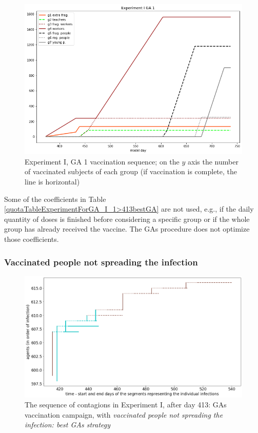 \documentclass[graybox]{svmult}
\begin{document}
\begin{figure}[t]
\center
\includegraphics[scale=0.45]{Experiment_I_GA_1_VaccinationSequence.png} %

\caption{Experiment I, GA 1 vaccination sequence; on the $y$ axis the number of vaccinated subjects of each group (if vaccination is complete, the line is horizontal)} 
\label{Experiment_I_GA1VaccinationSequence}
\end{figure}

Some of the coefficients in Table \ref{quotaTableExperimentForGA_I_1>413bestGA} are not used, e.g., if the daily quantity of doses is finished before considering a specific group or if the whole group has already received the vaccine. The GAs procedure does not optimize those coefficients.




\subsubsection{Vaccinated people not spreading the infection}


\begin{figure}[t]
\center
\includegraphics[scale=0.3]{ExperimentForGA_I_0>413bestGA.png}

\caption{The sequence of contagions in Experiment I, after day 413: GAs vaccination campaign, with \emph{vaccinated people not spreading the infection: best GAs strategy}}
\label{ExperimentForGA_I_0>413bestGA}
\end{figure}
\end{document}
